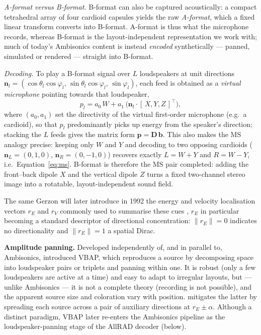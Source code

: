 \emph{A-format versus B-format.} B-format can also be captured acoustically:
a compact tetrahedral array of four cardioid capsules yields the raw
\emph{A-format}, which a fixed linear transform converts into B-format. A-format
is thus what the microphone records, whereas B-format is the
layout-independent representation we work with; much of today's Ambisonics
content is instead \emph{encoded} synthetically --- panned, simulated or
rendered --- straight into B-format.

\emph{Decoding.} To play a B-format signal over $L$ loudspeakers at unit
directions $\mathbf{n}_l = (\cos\theta_l\cos\varphi_l,\,
\sin\theta_l\cos\varphi_l,\, \sin\varphi_l)$, each feed is obtained as a
\emph{virtual microphone} pointing towards that loudspeaker,
\begin{equation}
    p_l = a_0\,W + a_1\,\big(\mathbf{n}_l \cdot [\,X, Y, Z\,]^\top\big),
    \label{eq:foa_decode}
\end{equation}
where $(a_0, a_1)$ set the directivity of the virtual first-order
microphone (e.g.\ a cardioid), so that $p_l$ predominantly picks up energy
from the speaker's direction; stacking the $L$ feeds gives the matrix form
$\mathbf{p} = \mathbf{D}\,\mathbf{b}$. This also makes the \acrshort{MS}
analogy precise: keeping only $W$ and $Y$ and decoding to two opposing
cardioids ($\mathbf{n}_{L} = (0,1,0)$, $\mathbf{n}_{R} = (0,-1,0)$) recovers
exactly $L = W + Y$ and $R = W - Y$, i.e.\ Equation~\ref{eq:ms}. B-format is
therefore the \acrshort{MS} pair completed: adding the front--back dipole $X$
and the vertical dipole $Z$ turns a fixed two-channel stereo image into a
rotatable, layout-independent sound field.

The same Gerzon will later introduce in 1992 the energy
and velocity localisation vectors $r_E$ and $r_V$ commonly used to
summarise these cues \citep{gerzon1992general},
$r_E$ in particular becoming a standard descriptor of directional
concentration: $\|r_E\| = 0$ indicates no directionality and
$\|r_E\| = 1$ a spatial Dirac.


\textbf{Amplitude panning.}
Developed independently of, and in parallel to, Ambisonics,
\citet{pulkki1997virtual} introduced \acrfull{VBAP}, which reproduces a
source by decomposing space into loudspeaker pairs or triplets and panning
within one. It is robust (only a few loudspeakers are active at a time) and
easy to adapt to irregular layouts, but --- unlike Ambisonics --- it is not
a complete theory (recording is not possible), and the apparent source size
and coloration vary with position. \citet{pulkki1999uniform} mitigates the
latter by spreading each source across a pair of auxiliary directions at
$r_E \pm \alpha$. Although a distinct paradigm, \acrshort{VBAP} later
re-enters the Ambisonics pipeline as the loudspeaker-panning stage of the
AllRAD decoder (below).

